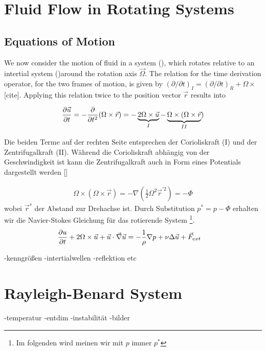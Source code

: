 \newpage

\section{Fluid Flow in Rotating Systems}
\subsection{Equations of Motion}

We now consider the motion of fluid in a system (), which rotates relative to an intertial system ()around the rotation axis $\vec{\Omega}$.
The relation for the time derivation operator, for the two frames of motion, is given by $(\partial/\partial t)_I = (\partial/\partial t)_R + \Omega \times $ [cite].
Applying this relation twice to the position vector $\vec{r}$ results into

\begin{align}
    \pdn[\vec{u}]{t} = -\pdn[]{t^2}(\Omega \times \vec{r}) = -\underbrace{2\Omega \times \vec{u}}_{I} - \underbrace{\Omega \times (\Omega \times \vec{r}}_{II})
\end{align}


Die beiden Terme auf der rechten Seite entsprechen der Corioliskraft (I) und der Zentrifugalkraft (II). Während die Corioliskraft abhängig von der Geschwindigkeit ist
kann die Zentrifugalkraft auch in Form eines Potentials dargestellt werden []

\begin{align}
    \Omega \times (\Omega \times \vec{r}) = - \nabla(\frac{1}{2}\Omega^2\vec{r}^{'2}) = -\Phi
\end{align}
wobei $\vec{r}^s$ der Abstand zur Drehachse ist. Durch Substitution $p^* = p - \Phi$
erhalten wir die Navier-Stokes Gleichung für das rotierende System \footnote{Im folgenden wird meinen wir mit $p$ immer $p^*$ }.
\begin{align}
    \pdn[u]{t} + 2\Omega \times \vec{u} +  \vec{u} \cdot \vec{\nabla} \vec{u} &= - \frac{1}{\rho} \nabla p + \nu \Delta \vec{u} + \vec{F}_{ext}
\end{align}

-kenngrößen
-intertialwellen
-reflektion etc

\section{Rayleigh-Benard System}
-temperatur
-entdim
-instabilität
-bilder





